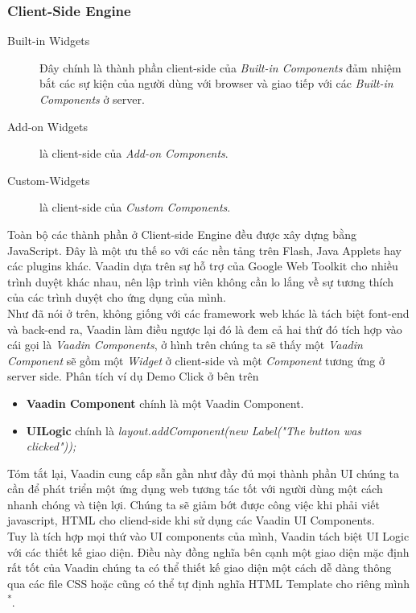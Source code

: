 \subsubsection{Client-Side Engine}
\begin{description}
\item[Built-in Widgets] Đây chính là thành phần client-side của \textit{Built-in Components} đảm nhiệm bắt các sự kiện của người dùng với browser và giao tiếp với các \textit{Built-in Components} ở server.
\item[Add-on Widgets] là client-side của \textit{Add-on Components}.
\item[Custom-Widgets] là client-side của \textit{Custom Components}.
\end{description}
Toàn bộ các thành phần ở Client-side Engine đều được xây dựng bằng JavaScript. Đây là một ưu thế so với các nền tảng trên Flash, Java Applets hay các plugins khác. Vaadin dựa trên sự hỗ trợ của Google Web Toolkit cho nhiều trình duyệt khác nhau, nên lập trình viên không cần lo lắng về sự tương thích của các trình duyệt cho ứng dụng của mình.
\\
Như đã nói ở trên, không giống với các framework web khác là tách biệt font-end và back-end ra, Vaadin làm điều ngược lại đó là đem cả hai thứ đó tích hợp vào cái gọi là \textit{Vaadin Components}, ở hình trên chúng ta sẽ thấy một \textit{Vaadin Component} sẽ gồm một \textit{Widget} ở client-side  và một \textit{Component} tương ứng ở server side. Phân tích ví dụ Demo Click ở bên trên 
\begin{itemize}
\item \textbf{Vaadin Component} chính là một Vaadin Component.
\item \textbf{UILogic} chính là \textit{layout.addComponent(new Label("The button was clicked"));}
\end{itemize}

Tóm tắt lại, Vaadin cung cấp sẵn gần như đầy đủ mọi thành phần UI chúng ta cần để phát triển một ứng dụng web tương tác tốt với người dùng một cách nhanh chóng và tiện lợi. Chúng ta sẽ giảm bớt được công việc khi phải viết javascript, HTML cho cliend-side khi sử dụng các Vaadin UI Components.
\\
Tuy là tích hợp mọi thứ vào UI components của mình, Vaadin tách biệt UI Logic với các thiết kế giao diện. Điều này đồng nghĩa bên cạnh một giao diện mặc định rất tốt của Vaadin chúng ta có thể thiết kế giao diện một cách dễ dàng thông qua các file CSS hoặc cũng có thể tự định nghĩa HTML Template cho riêng mình \textsuperscript{*}. 
{\let\thefootnote\relax{}
}


